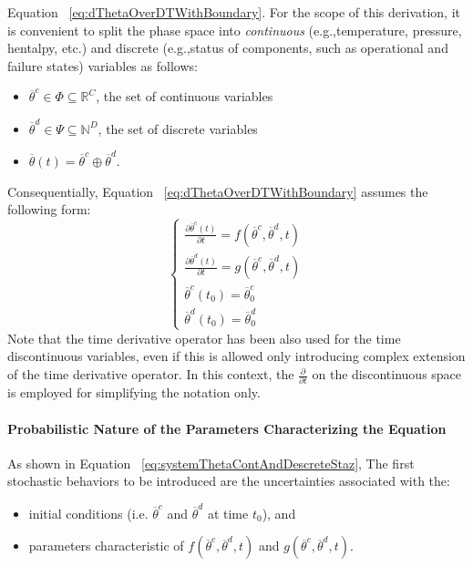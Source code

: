Equation ~\ref{eq:dThetaOverDTWithBoundary}.
For the scope of this derivation, it is convenient to split the phase space into \textit{continuous} (e.g.,temperature,
pressure, hentalpy, etc.) and discrete (e.g.,status of components, such as operational and failure states) variables
as follows: 
\begin{itemize}
 \item $ \overline{\theta}^{c} \in \Phi \subseteq \mathbb{R}^{C}$, the set of continuous variables
 \item $ \overline{\theta}^{d} \in \Psi \subseteq \mathbb{N}^{D}$, the set of discrete variables
 \item $\overline{\theta}(t) = \overline{\theta}^{c} \oplus \overline{\theta}^{d}$.
\end{itemize}
Consequentially, Equation ~\ref{eq:dThetaOverDTWithBoundary} assumes the following form:
\begin{equation}
\label{eq:systemThetaContAndDescrete}
\left\{\begin{matrix}
\frac{\partial  \overline{\theta}^{c}\left ( t \right )}{\partial t}=f\left ( \overline{\theta}^{c},\overline{\theta}^{d},t \right ) \\ 
\frac{\partial  \overline{\theta}^{d}\left ( t \right )}{\partial t}=g\left ( \overline{\theta}^{c},\overline{\theta}^{d},t \right )\\
 \overline{\theta}^{c}\left ( t_{0} \right ) = \overline{\theta}^{c}_{0}\\
 \overline{\theta}^{d}\left ( t_{0} \right ) = \overline{\theta}^{d}_{0}
\end{matrix}\right.
\end{equation}
Note that the time derivative operator has been also used for the time discontinuous variables, even
if this is allowed only introducing complex extension of the time derivative operator. In this context, the $\frac{\partial  }{\partial t}$ on the discontinuous space is employed for simplifying the notation only.

\paragraph{Probabilistic Nature of the Parameters Characterizing the Equation}
As shown in Equation ~\ref{eq:systemThetaContAndDescreteStaz}, The first stochastic behaviors to be introduced are the 
uncertainties associated with the:
\begin{itemize}
  \item initial conditions (i.e. $\overline{\theta}^{c}$ and $\overline{\theta}^{d}$ at time $t_{0}$), and
  \item parameters characteristic of  $f\left ( \overline{\theta}^{c},\overline{\theta}^{d},t \right )$ and $g\left ( \overline{\theta}^{c},\overline{\theta}^{d},t \right )$.
\end{itemize}

